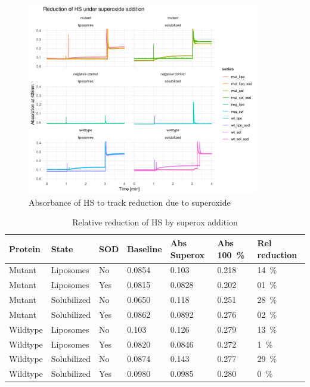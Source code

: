 \begin{figure}
	\centering
	\includegraphics[width=0.9\textwidth]{img/reduction_superox.png}
	\caption{Absorbance of HS to track reduction due to superoxide}
	\label{fig:reduction_superox}
\end{figure}

\begin{table}
	\centering
	\begin{tabu}{lllllll}
		\toprule
		Protein & State & SOD & Baseline & Abs Superox & Abs \SI{100}{\percent} & Rel reduction \\
		\midrule
		Mutant   & Liposomes   & No   &          0.0854    &            0.103               &   0.218         &  \SI{14}{\percent}   \\
		Mutant   & Liposomes   & Yes  &            0.0815  &              0.0828            &     0.202       &  \SI{01}{\percent}  \\
		Mutant   & Solubilized & No   &          0.0650    &            0.118               &   0.251         &  \SI{28}{\percent}   \\
		Mutant   & Solubilized & Yes  &            0.0862  &              0.0892            &     0.276       &  \SI{02}{\percent}  \\
		Wildtype & Liposomes   & No   &          0.103     &            0.126               &   0.279         &  \SI{13}{\percent}  \\
		Wildtype & Liposomes   & Yes  &            0.0820  &              0.0846            &     0.272       &  \SI{1 }{\percent} \\
		Wildtype & Solubilized & No   &          0.0874    &            0.143               &   0.277         &  \SI{29}{\percent}  \\
		Wildtype & Solubilized & Yes  &            0.0980  &              0.0985            &     0.280       &  \SI{0 }{\percent} \\
		\bottomrule
	\end{tabu}
	\caption{Relative reduction of HS by superox addition}
	\label{tbl:reduction_superox}
\end{table}

